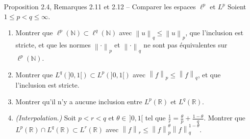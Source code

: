 \documentclass[11pt,a4paper]{article}
\newcommand{\R}{\mathbb{R}}
\newcommand{\N}{\mathbb{N}}
\newcommand{\norm}[1]{\left\|#1\right\|}
\theoremstyle{definition}
\begin{document}
\begin{exo}{Proposition 2.4, Remarques 2.11 et 2.12 -- Comparer les espaces $\ell^p$ et $L^p$}
Soient $1\le p<q\le\infty$.
\begin{enumerate}[label=(\alph*)]
  \item Montrer que $\ell^p(\N)\subset\ell^q(\N)$ avec $\norm u_q\le\norm u_p$, que l'inclusion est stricte, et que les normes $\norm\cdot_p$ et $\norm\cdot_q$ ne sont pas équivalentes sur $\ell^p(\N)$.
  \item Montrer que $L^q(]0,1[)\subset L^p(]0,1[)$ avec $\norm f_p\le\norm f_q$, et que l'inclusion est stricte.
  \item Montrer qu'il n'y a aucune inclusion entre $L^p(\R)$ et $L^q(\R)$.
  \item \emph{(Interpolation.)} Soit $p<r<q$ et $\theta\in\,]0,1[$ tel que $\frac1r=\frac\theta p+\frac{1-\theta}q$. Montrer que $L^p(\R)\cap L^q(\R)\subset L^r(\R)$ avec $\norm f_r\le\norm f_p^\theta\norm f_q^{1-\theta}$.
\end{enumerate}
\end{exo}
\end{document}
